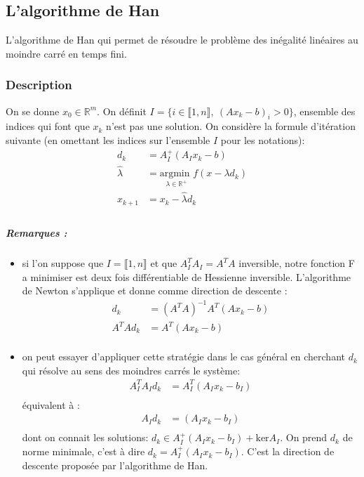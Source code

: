\documentclass[10pt,a4paper]{article}
\begin{document}
\subsection{L'algorithme de Han}

L'algorithme de Han \cite{hanalgo} qui permet de résoudre le problème des inégalité linéaires au moindre carré en temps fini.

\subsubsection{Description}
On se donne $x_0 \in \mathbb{R}^m$.
On définit $I=\lbrace i \in \llbracket 1,n \rrbracket, \ (Ax_k - b)_i > 0 \rbrace$, ensemble des indices qui font que $x_k$ n'est pas une solution.
On considère la formule d'itération suivante (en omettant les indices sur l'ensemble $I$ pour les notations):
\begin{equation}
\begin{aligned}
  d_k & = A_I^+(A_I x_k - b)\\
  \widehat{\lambda} &= \underset{\lambda \in \mathbb{R}^+}{\text{argmin }}f(x - \lambda d_k)\\
  x_{k+1} & =x_k - \widehat{\lambda} d_k \\
  \end{aligned}
\end{equation}
\subparagraph{Remarques :}
\begin{itemize}
  \item si l'on suppose que $I = \llbracket 1,n \rrbracket$ et que $A_I^TA_I = A^TA$ inversible, notre fonction F a minimiser est deux fois différentiable de Hessienne inversible.
    L'algorithme de Newton  s'applique et donne comme direction de descente :
    \begin{equation}
\begin{aligned}
      d_k &= (A^TA)^{-1}A^T(A x_k - b) \\
      A^TA d_k &= A^T(A x_k - b) \\
    \end{aligned}
    \end{equation}
  \item on peut essayer d'appliquer cette stratégie dans le cas général en cherchant $d_k$ qui résolve au sens des moindres carrés le système:
    \begin{equation}
\begin{aligned}
      A_I^TA_I d_k &= A_I^T(A_I x_k - b_I) \\
    \end{aligned}
    \end{equation}
    équivalent à :
    \begin{equation}
\begin{aligned}
      A_I d_k &= (A_I x_k - b_I) \\
    \end{aligned}
    \end{equation}
    dont on connait les solutions: $d_k \in A_I^+(A_I x_k -b_I) + \text{ker}A_I$.
    On prend $d_k$ de norme minimale, c'est à dire $d_k = A_I^+(A_I x_k -b_I)$.
    C'est la direction de descente proposée par l'algorithme de Han.
\end{itemize}
\end{document}
